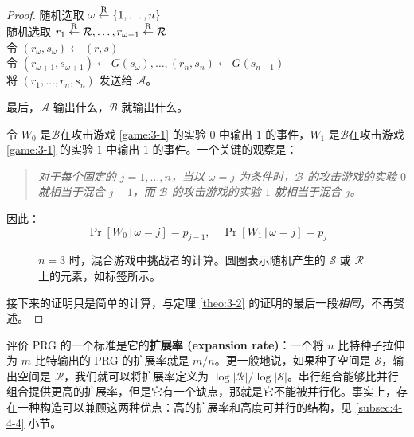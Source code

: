 \begin{proof}
\vspace*{5pt}

\hspace*{28.5pt} 随机选取 $\omega\overset{\rm R}\leftarrow\{1,\dots,n\}$\\
\hspace*{50pt} 随机选取 $r_1\overset{\rm R}\leftarrow\mathcal R,\dots,r_{\omega-1}\overset{\rm R}\leftarrow\mathcal R$\\
\hspace*{50pt} 令 $(r_{\omega},s_{\omega})\leftarrow(r,s)$\\
\hspace*{50pt} 令 $(r_{\omega+1},s_{\omega+1})\leftarrow G(s_{\omega}),\dots,(r_n,s_n)\leftarrow G(s_{n-1})$\\
\hspace*{50pt} 将 $(r_1,\dots,r_n,s_n)$ 发送给 $\mathcal A$。

\vspace*{5pt}

\hspace*{5pt} 最后，$\mathcal A$ 输出什么，$\mathcal B$ 就输出什么。

\vspace*{10pt}

令 $W_0$ 是$\mathcal B$在攻击游戏 \ref{game:3-1} 的实验 $0$ 中输出 $1$ 的事件，$W_1$ 是$\mathcal B$在攻击游戏 \ref{game:3-1} 的实验 $1$ 中输出 $1$ 的事件。一个关键的观察是：
\begin{quote}
\emph{对于每个固定的 $j=1,\dots,n$，当以 $\omega=j$ 为条件时，$\mathcal B$ 的攻击游戏的实验 $0$ 就相当于混合 $j-1$，而 $\mathcal B$ 的攻击游戏的实验 $1$ 就相当于混合 $j$。
}
\end{quote}
因此：
\[
\Pr[W_0\,|\,\omega=j]=p_{j-1},
\quad
\Pr[W_1\,|\,\omega=j]=p_{j}
\]

\begin{figure}
	\centering
	
	\caption{$n=3$ 时，混合游戏中挑战者的计算。圆圈表示随机产生的 $\mathcal{S}$ 或 $\mathcal{R}$ 上的元素，如标签所示。}
	\label{fig:3-7}
\end{figure}

接下来的证明只是简单的计算，与定理 \ref{theo:3-2} 的证明的最后一段\emph{相同}，不再赘述。
\end{proof}

评价 PRG 的一个标准是它的\textbf{扩展率 (expansion rate)}：一个将 $n$ 比特种子拉伸为 $m$ 比特输出的 PRG 的扩展率就是 $m/n$。更一般地说，如果种子空间是 $\mathcal{S}$，输出空间是 $\mathcal{R}$，我们就可以将扩展率定义为 $\log|\mathcal{R}|/\log|\mathcal{S}|$。串行组合能够比并行组合提供更高的扩展率，但是它有一个缺点，那就是它不能被并行化。事实上，存在一种构造可以兼顾这两种优点：高的扩展率和高度可并行的结构，见 \ref{subsec:4-4-4} 小节。

